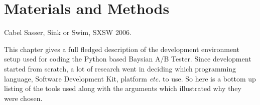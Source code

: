 \chapter{Materials and Methods}
\label{chap:devTools}
\begin{epigraphs}
%
      {Cabel Sasser, Sink or Swim, SXSW 2006}.
\end{epigraphs}
This chapter gives a full fledged description of the development environment setup used for coding the Python based Baysian A/B Tester. Since development started from scratch, a lot of research went in deciding which programming language, Software Development Kit, platform \emph{etc.} to use. So here is a bottom up listing of the tools used along with the arguments which illustrated why they were chosen.


